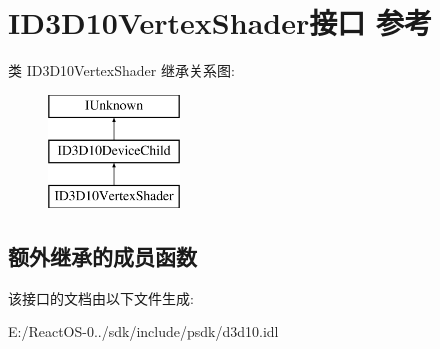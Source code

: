 \hypertarget{interface_i_d3_d10_vertex_shader}{}\section{I\+D3\+D10\+Vertex\+Shader接口 参考}
\label{interface_i_d3_d10_vertex_shader}
类 I\+D3\+D10\+Vertex\+Shader 继承关系图\+:\begin{figure}[H]
\begin{center}
\leavevmode
\includegraphics[height=3.000000cm]{interface_i_d3_d10_vertex_shader}
\end{center}
\end{figure}
\subsection*{额外继承的成员函数}


该接口的文档由以下文件生成\+:\begin{DoxyCompactItemize}
\item 
E\+:/\+React\+O\+S-\/0../sdk/include/psdk/d3d10.\+idl\end{DoxyCompactItemize}
